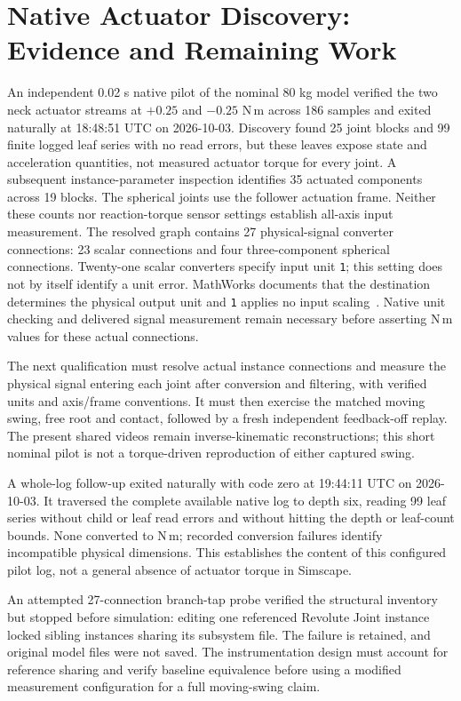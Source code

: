\documentclass[11pt,a4paper]{article}
\begin{document}
\section{Native Actuator Discovery: Evidence and Remaining Work}
\label{sec:actuator-discovery}
An independent 0.02 s native pilot of the nominal 80 kg model verified
the two neck actuator streams at $+0.25$ and $-0.25$ N\,m across 186
samples and exited naturally at 18:48:51 UTC on 2026-10-03. Discovery
found 25 joint blocks and 99 finite logged leaf series with no read
errors, but these leaves expose state and acceleration quantities, not
measured actuator torque for every joint. A subsequent instance-parameter
inspection identifies 35 actuated components across 19 blocks. The
spherical joints use the follower actuation frame. Neither these counts
nor reaction-torque sensor settings establish all-axis input measurement.
The resolved graph contains 27 physical-signal converter connections:
23 scalar connections and four three-component spherical connections.
Twenty-one scalar converters specify input unit \texttt{1}; this setting
does not by itself identify a unit error. MathWorks documents that the
destination determines the physical output unit and \texttt{1} applies
no input scaling~\cite{MathWorksPSUnits}. Native unit checking and delivered
signal measurement remain necessary before asserting N\,m values for
these actual connections.

The next qualification must resolve actual instance connections and
measure the physical signal entering each joint after conversion and
filtering, with verified units and axis/frame conventions. It must then
exercise the matched moving swing, free root and contact, followed by a
fresh independent feedback-off replay. The present shared videos remain
inverse-kinematic reconstructions; this short nominal pilot is not a
torque-driven reproduction of either captured swing.

A whole-log follow-up exited naturally with code zero at 19:44:11 UTC
on 2026-10-03. It traversed the complete available native log to depth
six, reading 99 leaf series without child or leaf read errors and without
hitting the depth or leaf-count bounds. None converted to N\,m; recorded
conversion failures identify incompatible physical dimensions. This
establishes the content of this configured pilot log, not a general
absence of actuator torque in Simscape.

An attempted 27-connection branch-tap probe verified the structural
inventory but stopped before simulation: editing one referenced Revolute
Joint instance locked sibling instances sharing its subsystem file.
The failure is retained, and original model files were not saved.
The instrumentation design must account for reference sharing and verify
baseline equivalence before using a modified measurement configuration
for a full moving-swing claim.
\end{document}
